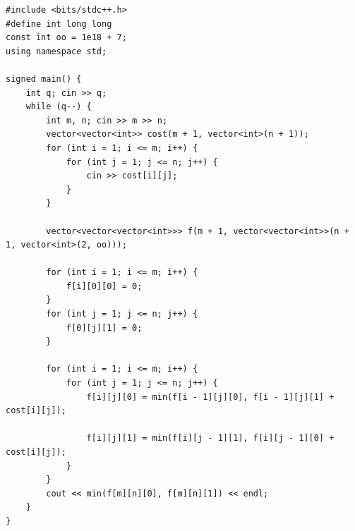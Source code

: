 \begin{lstlisting}[title=\centering\textbf{Cài đặt}]
#include <bits/stdc++.h>
#define int long long
const int oo = 1e18 + 7;
using namespace std;

signed main() {
    int q; cin >> q;
    while (q--) {
        int m, n; cin >> m >> n;
        vector<vector<int>> cost(m + 1, vector<int>(n + 1));
        for (int i = 1; i <= m; i++) {
            for (int j = 1; j <= n; j++) {
                cin >> cost[i][j];
            }
        }

        vector<vector<vector<int>>> f(m + 1, vector<vector<int>>(n + 1, vector<int>(2, oo)));

        for (int i = 1; i <= m; i++) {
            f[i][0][0] = 0;
        }
        for (int j = 1; j <= n; j++) {
            f[0][j][1] = 0;
        }

        for (int i = 1; i <= m; i++) {
            for (int j = 1; j <= n; j++) {
                f[i][j][0] = min(f[i - 1][j][0], f[i - 1][j][1] + cost[i][j]);

                f[i][j][1] = min(f[i][j - 1][1], f[i][j - 1][0] + cost[i][j]);
            }
        }
        cout << min(f[m][n][0], f[m][n][1]) << endl;
    }
}
\end{lstlisting}


